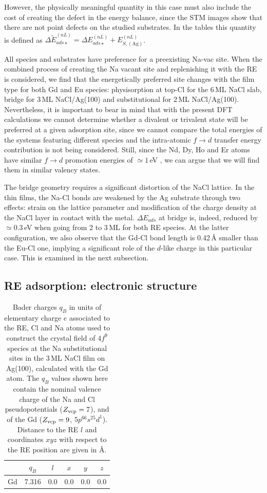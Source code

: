 {However, the physically meaningful quantity in this case must also include
the cost of creating the defect in the energy balance, since the STM images
show that there are not point defects on the studied substrates.
In the tables this quantity is defined as
$\Delta \tilde E_{ads\star}^{(nL)} = \Delta E_{ads\star}^{(nL)} + E_{S,(\mathrm{Ag})}^{(nL)}$.

All species and substrates have preference for a preexisting Na-vac site.
When the combined process of creating the Na vacant site and replenishing it with the RE is considered, we find
that the energetically preferred site changes with the film type for both Gd and Eu species:
physisorption at top-Cl for the 6\,ML NaCl slab,
bridge for 3\,ML NaCl/Ag(100) and substitutional for 2\,ML NaCl/Ag(100).
Nevertheless, it is important to bear in mind that with the present DFT calculations
we cannot determine whether a divalent or trivalent state will be preferred at
a given adsorption site, since
we cannot compare the total energies of the systems featuring different species and
the intra-atomic $f \to d$ transfer energy contribution is not being considered.
Still, since the Nd, Dy, Ho and Er atoms have similar $f \to d$ promotion
energies of $\simeq 1$\,eV \cite{bib:delin97}, we can argue that we will find them
in similar valency states.


The bridge geometry requires a significant distortion of the NaCl lattice.
In the thin films, the Na-Cl bonds are weakened by the Ag substrate through two effects:
strain on the lattice parameter and modification of the charge density at the NaCl layer in
contact with the metal.
$\Delta E_{ads}$ at bridge is, indeed, reduced by $\simeq 0.3$\,eV when going from 2 to 3\,ML
for both RE species. At the latter configuration, we also observe that the Gd-Cl bond length is 0.42\,{\AA}
smaller than the Eu-Cl one, implying a significant role of the $d$-like charge in this particular case.
This is examined in the next subsection.


\subsection{RE adsorption: electronic structure}

\begin{table}[b!]
\caption{Bader charges $q_B$ in units of elementary charge $e$ associated to the RE, Cl and Na atoms
used to construct the crystal field of $4f^9$ species at the
Na substitutional sites in the 3\,ML NaCl film on Ag(100), calculated with the Gd atom. The $q_B$ values shown here contain the nominal valence charge of the Na and Cl pseudopotentials ($Z_{\rm vcp}=7$), and of the Gd ($Z_{\rm vcp}=9$, $5p^66s^25d^1$).
Distance to the RE $l$ and coordinates $xyz$ with respect to the RE position are given in {\AA}.
}
\renewcommand{\arraystretch}{1.13}
\begin{ruledtabular}
 \begin{tabular}{c  c  c  c  c  c  }
     &  $q_B$ & $l$ &  $x$  & $y$ &  $z$ \\
\hline
Gd &  7.316 & 0.0 &  0.0 &   0.0 &   0.0 \\


\end{tabular}
\end{ruledtabular}
\end{table}}
